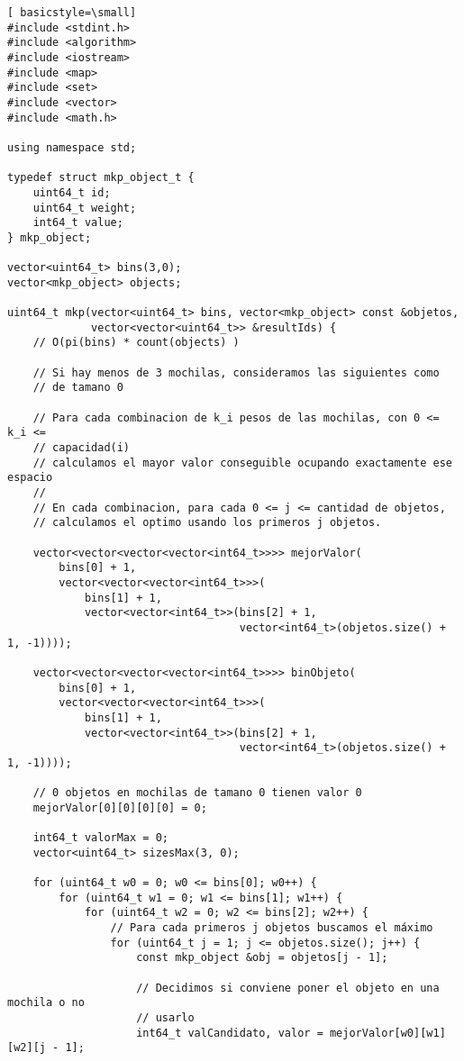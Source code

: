\begin{lstlisting}[ basicstyle=\small]
#include <stdint.h>
#include <algorithm>
#include <iostream>
#include <map>
#include <set>
#include <vector>
#include <math.h>

using namespace std;

typedef struct mkp_object_t {
    uint64_t id;
    uint64_t weight;
    int64_t value;
} mkp_object;

vector<uint64_t> bins(3,0);
vector<mkp_object> objects;

uint64_t mkp(vector<uint64_t> bins, vector<mkp_object> const &objetos,
             vector<vector<uint64_t>> &resultIds) {
    // O(pi(bins) * count(objects) )

    // Si hay menos de 3 mochilas, consideramos las siguientes como
    // de tamano 0

    // Para cada combinacion de k_i pesos de las mochilas, con 0 <= k_i <=
    // capacidad(i)
    // calculamos el mayor valor conseguible ocupando exactamente ese espacio
    //
    // En cada combinacion, para cada 0 <= j <= cantidad de objetos,
    // calculamos el optimo usando los primeros j objetos.

    vector<vector<vector<vector<int64_t>>>> mejorValor(
        bins[0] + 1,
        vector<vector<vector<int64_t>>>(
            bins[1] + 1,
            vector<vector<int64_t>>(bins[2] + 1,
                                    vector<int64_t>(objetos.size() + 1, -1))));

    vector<vector<vector<vector<int64_t>>>> binObjeto(
        bins[0] + 1,
        vector<vector<vector<int64_t>>>(
            bins[1] + 1,
            vector<vector<int64_t>>(bins[2] + 1,
                                    vector<int64_t>(objetos.size() + 1, -1))));

    // 0 objetos en mochilas de tamano 0 tienen valor 0
    mejorValor[0][0][0][0] = 0;

    int64_t valorMax = 0;
    vector<uint64_t> sizesMax(3, 0);

    for (uint64_t w0 = 0; w0 <= bins[0]; w0++) {
        for (uint64_t w1 = 0; w1 <= bins[1]; w1++) {
            for (uint64_t w2 = 0; w2 <= bins[2]; w2++) {
                // Para cada primeros j objetos buscamos el máximo
                for (uint64_t j = 1; j <= objetos.size(); j++) {
                    const mkp_object &obj = objetos[j - 1];

                    // Decidimos si conviene poner el objeto en una mochila o no
                    // usarlo
                    int64_t valCandidato, valor = mejorValor[w0][w1][w2][j - 1];


\end{lstlisting}
